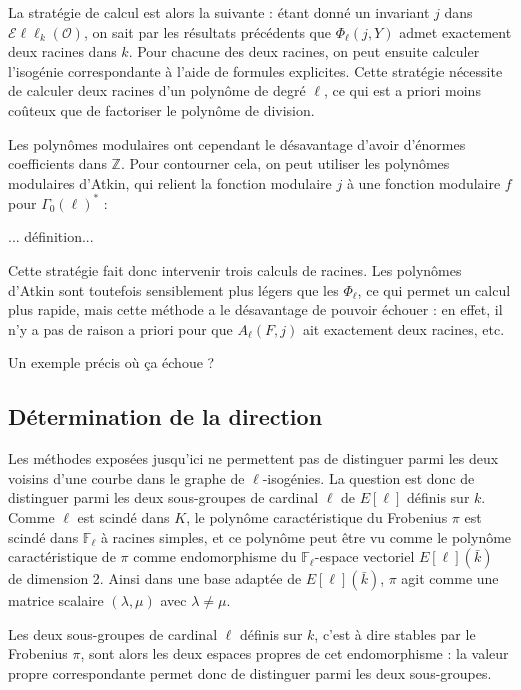 \documentclass[11pt,a4paper]{article}
\newcommand{\Z}{\mathbb{Z}}
\newcommand{\F}{\mathbb{F}}
\renewcommand{\O}{\mathcal{O}}
\newcommand{\Ell}{\mathcal{E}\ell\ell}
\theoremstyle{definition}
\begin{document}
La stratégie de calcul est alors la suivante : étant donné un invariant $j$ dans $\Ell_k(\O)$, on sait par les résultats précédents que $\Phi_\ell(j,Y)$ admet exactement deux racines dans $k$. Pour chacune des deux racines, on peut ensuite calculer l'isogénie correspondante à l'aide de formules explicites. Cette stratégie nécessite de calculer deux racines d'un polynôme de degré $\ell$, ce qui est a priori moins coûteux que de factoriser le polynôme de division.

Les polynômes modulaires ont cependant le désavantage d'avoir d'énormes coefficients dans $\Z$. Pour contourner cela, on peut utiliser les polynômes modulaires d'Atkin, qui relient la fonction modulaire $j$ à une fonction modulaire $f$ pour $\Gamma_0(\ell)^*$ :

... définition...

Cette stratégie fait donc intervenir trois calculs de racines. Les polynômes d'Atkin sont toutefois sensiblement plus légers que les $\Phi_\ell$, ce qui permet un calcul plus rapide, mais cette méthode a le désavantage de pouvoir échouer : en effet, il n'y a pas de raison a priori pour que $A_\ell(F,j)$ ait exactement deux racines, etc.

Un exemple précis où ça échoue ?



\newpage


\subsection{Détermination de la direction}



Les méthodes exposées jusqu'ici ne permettent pas de distinguer parmi les deux voisins d'une courbe dans le graphe de $\ell$-isogénies. La question est donc de distinguer parmi les deux sous-groupes de cardinal $\ell$ de $E[\ell]$ définis sur $k$. Comme $\ell$ est scindé dans $K$, le polynôme caractéristique du Frobenius $\pi$ est scindé dans $\F_\ell$ à racines simples, et ce polynôme peut être vu comme le polynôme caractéristique de $\pi$ comme endomorphisme du $\F_\ell$-espace vectoriel $E[\ell](\bar{k})$ de dimension 2. Ainsi dans une base adaptée de $E[\ell](\bar{k})$, $\pi$ agit comme une matrice scalaire $(\lambda,\mu)$ avec $\lambda\neq\mu$.

Les deux sous-groupes de cardinal $\ell$ définis sur $k$, c'est à dire stables par le Frobenius $\pi$, sont alors les deux espaces propres de cet endomorphisme : la valeur propre correspondante permet donc de distinguer parmi les deux sous-groupes.
\end{document}
